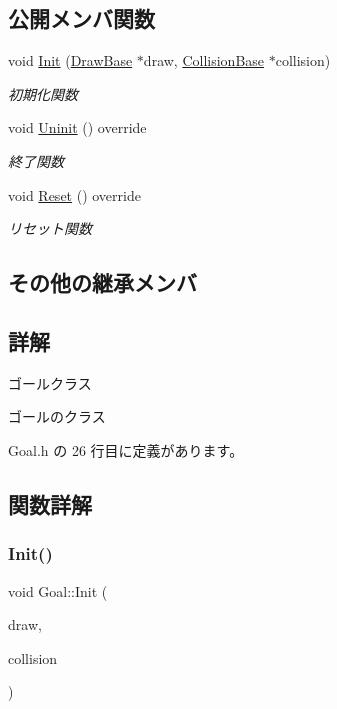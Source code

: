 \subsection*{公開メンバ関数}
\begin{DoxyCompactItemize}
\item 
void \mbox{\hyperlink{class_goal_a694beb5a9164e2bea59fc43affbaa060}{Init}} (\mbox{\hyperlink{class_draw_base}{Draw\+Base}} $\ast$draw, \mbox{\hyperlink{class_collision_base}{Collision\+Base}} $\ast$collision)
\begin{DoxyCompactList}\small\item\em 初期化関数 \end{DoxyCompactList}\item 
void \mbox{\hyperlink{class_goal_a48126385a674bcda855e2a61561fbf9f}{Uninit}} () override
\begin{DoxyCompactList}\small\item\em 終了関数 \end{DoxyCompactList}\item 
void \mbox{\hyperlink{class_goal_a98b797c8012ab43d6fc8c42e4e91466b}{Reset}} () override
\begin{DoxyCompactList}\small\item\em リセット関数 \end{DoxyCompactList}\end{DoxyCompactItemize}
\subsection*{その他の継承メンバ}


\subsection{詳解}
ゴールクラス 

ゴールのクラス 

 Goal.\+h の 26 行目に定義があります。



\subsection{関数詳解}
\mbox{\label{class_goal_a694beb5a9164e2bea59fc43affbaa060}} 
\subsubsection{\texorpdfstring{Init()}{Init()}}
{\footnotesize\ttfamily void Goal\+::\+Init (\begin{DoxyParamCaption}\item[{\mbox{\hyperlink{class_draw_base}{Draw\+Base}} $\ast$}]{draw,  }\item[{\mbox{\hyperlink{class_collision_base}{Collision\+Base}} $\ast$}]{collision }\end{DoxyParamCaption})}



